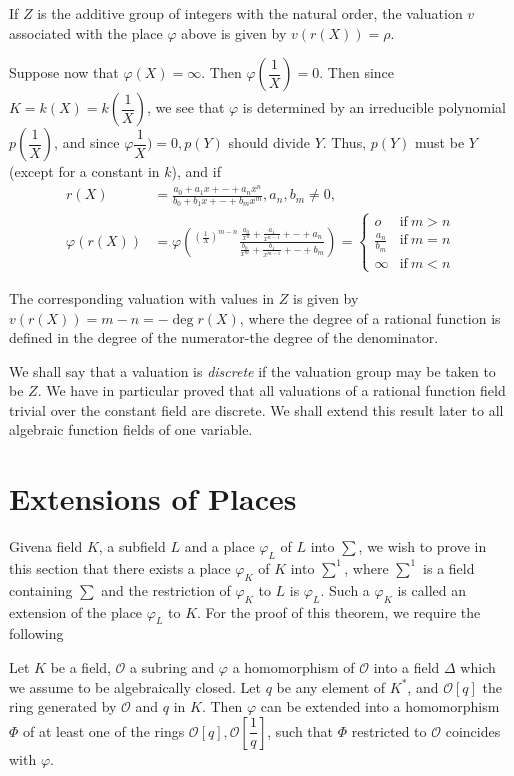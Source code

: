 If $Z$ is the additive group of integers with the natural order, the
valuation $v$ associated with the place $\varphi$ above is given by
$v(r(X)) = \rho$. 
\begin{Case} %
  Suppose now that $\varphi (X) = \infty$. Then $\varphi
  (\dfrac{1}{X}) = 0$. Then since $K = k(X) = k(\dfrac{1}{X})$, we see
  that $\varphi$ is determined by an irreducible polynomial $p(\dfrac{1}{X})$,
  and since $\varphi \dfrac{1}{X}) = 0, p(Y)$ should divide $Y$. Thus,
  $p(Y)$ must be $Y$ (except for a constant in $k$), and if 
  \begin{align*}
    r(X) & = \frac{a_0 + a_1 x+ - + a_n x^n}{b_0 + b_1 x+ - + b_m x^m},
    a_n , b_m \neq 0, \\ 
    \varphi (r(X)) & = \varphi \left( ^{(\frac{1}{X})^{m-n}}
    \frac{\frac{a_0}{x^n} + \frac{a_1}{x^{n-1}} + - +
      a_n}{\frac{b_0}{x^m} + \frac{b_1}{x^{m-1}} + - + b_m} \right)
    = \begin{cases} 
      o & \text{if}~ m > n \\ 
      \frac{a_n}{b_m} & \text{if}~ m = n \\ 
      \infty & \text{if}~  m < n 
    \end{cases} 
  \end{align*}
\end{Case}

The corresponding valuation with values in $Z$ is given by $v(r(X)) =
m-n = -\deg r (X)$, where the degree of a rational function is defined
in the degree of the numerator-the degree of the denominator.  

We shall say that a valuation is \textit{discrete} if the valuation
group may be taken to be $Z$. We have in particular proved that all
valuations of a rational function field trivial over the constant
field are discrete. We shall extend this result later to all algebraic
function fields of one variable. 

\section{Extensions of Places}\label{chap3:sec5}

Given\pageoriginale a field $K$, a subfield $L$ and a place $\varphi_L$ of $L$ into
$\sum$, we wish to prove in this section that there exists a place
$\varphi_K$ of $K$ into $\sum^1$, where $\sum^1$ is a field containing
$\sum$ and the restriction of $\varphi_K$ to $L$ is $\varphi_L$. Such
a $\varphi_K$ is
called an extension of the place $\varphi_L$ to $K$. For the proof of
this theorem, we require the following 
\begin{lemma*}[({\em Chevalley}) ]
  Let $K$ be a field, $\mathscr{O}$ a subring and $\varphi$ a
  homomorphism of $\mathscr{O}$ into a field $\Delta$ which we assume
  to be algebraically closed. Let $q$ be any element of $K^*$, and
  $\mathscr{O}[q]$ the ring generated by $\mathscr{O}$ and $q$ in
  $K$. Then $\varphi$ can be extended into a homomorphism $\Phi$ of at
  least one of the rings $\mathscr{O}[q], \mathscr{O}[\dfrac{1}{q}]$,
  such that $\Phi$ restricted to $\mathscr{O}$ coincides with
  $\varphi$. 
\end{lemma*}

